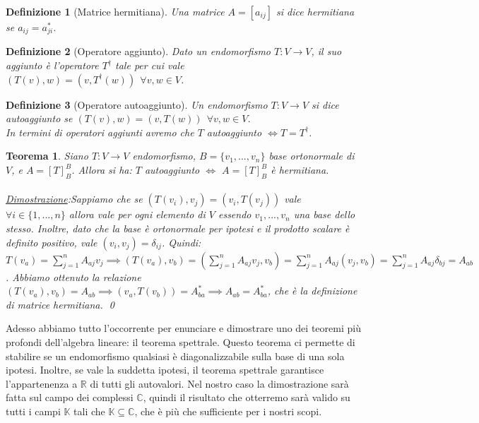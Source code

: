 \documentclass[a4paper,12pt]{report}
\newtheorem{teorema}{Teorema}[chapter]
\newtheorem{definizione}{Definizione}[chapter]
\begin{document}
\begin{definizione}[Matrice hermitiana]
    Una matrice $A=[a_{ij}]$ si dice hermitiana se $a_{ij}=a_{ji}^*$.
\end{definizione}

\begin{definizione}[Operatore aggiunto]
    Dato un endomorfismo $T:V \to V$, il suo aggiunto è l'operatore $T^\dagger$ tale per cui vale $(T(v), w)=(v,T^\dagger(w)) \ \ \forall v,w \in V$.
\end{definizione}

\begin{definizione}[Operatore autoaggiunto]
    Un endomorfismo $T:V \to V$ si dice autoaggiunto se $(T(v), w)=(v,T(w)) \ \ \forall v,w \in V$. 
    \\ In termini di operatori aggiunti avremo che $T$ autoaggiunto $\iff T=T^\dagger$.
\end{definizione}

\begin{teorema} \label{thm:1.7}
    Siano $T:V \to V$ endomorfismo, $B=\{v_1,...,v_n\}$ base ortonormale di $V$, e $A=[T]_B^B$. Allora si ha: $T$ autoaggiunto $\iff$ $A=[T]_B^B$ è hermitiana.
    \\
    \\ \underline{Dimostrazione}:Sappiamo che se $(T(v_i),v_j)=(v_i, T(v_j))$ vale $\forall i \in \{1,...,n\}$ allora vale per ogni elemento di $V$ essendo $v_1,...,v_n$ una base dello stesso. Inoltre, dato che la base è ortonormale per ipotesi e il prodotto scalare è definito positivo, vale $(v_i,v_j)=\delta_{ij}$. Quindi:
    \\$\scriptstyle{ \displaystyle T(v_a)=\displaystyle\sum _{j=1}^{n}A_{aj}v_j \implies (T(v_a),v_b)= \left(\displaystyle\sum_{j=1}^{n}A_{aj}v_j,v_b  \right)=\displaystyle\sum_{j=1}^{n}A_{aj}(v_j,v_b)=\displaystyle\sum_{j=1}^nA_{aj}\delta_{bj}=A_{ab}}$.
    Abbiamo ottenuto la relazione $(T(v_a),v_b)=A_{ab} \implies (v_a, T(v_b))=A_{ba}^* \implies A_{ab}=A_{ba}^*$, che è la definizione di matrice hermitiana. \qed
\end{teorema}

\newpage

Adesso abbiamo tutto l'occorrente per enunciare e dimostrare uno dei teoremi più profondi dell'algebra lineare: il teorema spettrale. Questo teorema ci permette di stabilire se un endomorfismo qualsiasi è diagonalizzabile sulla base di una sola ipotesi. Inoltre, se vale la suddetta ipotesi, il teorema spettrale garantisce l'appartenenza a $\mathbb{R}$ di tutti gli autovalori. 
Nel nostro caso la dimostrazione sarà fatta sul campo dei complessi $\mathbb{C}$, quindi il risultato che otterremo sarà valido su tutti i campi $\mathbb{K}$ tali che $\mathbb{K} \subseteq \mathbb{C}$, che è più che sufficiente per i nostri scopi.
\end{document}
